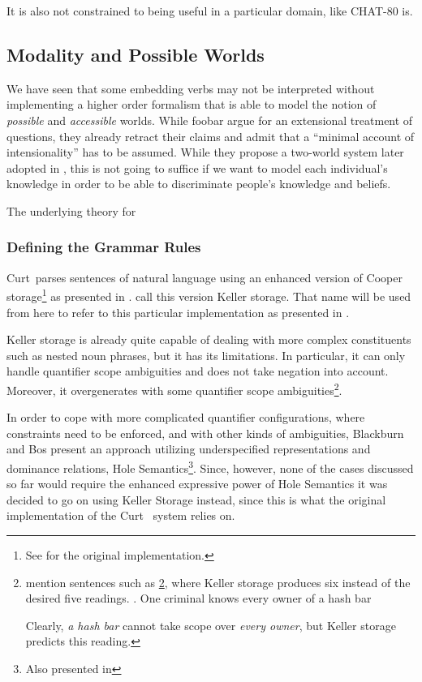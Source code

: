 \documentclass[12pt,a4paper]{article}
\newcommand{\pn}{\textsf} %
\newcommand{\example}{\textit} %
\newcommand{\curt}{\pn{Curt}\mbox{ }}
\theoremstyle{remark} \newtheorem*{termin}{Definition} %
\begin{document}
It is also not constrained to being useful in a particular domain, like
\pn{CHAT-80} is.

\subsection{Modality and Possible Worlds}
\label{sec:indices}

We have seen that some embedding verbs may not be interpreted without
implementing a higher order formalism that is able to model the notion of
\emph{possible} and \emph{accessible} worlds. While foobar %
argue for an extensional treatment of questions, they already %
retract their claims and admit that a ``minimal account of intensionality'' has
to be assumed. While they propose a two-world system later adopted in
\cite{g:is}, this is not going to suffice if we want to model each individual's
knowledge in order to be able to discriminate people's knowledge and beliefs.

The underlying theory for 

\subsubsection{Defining the Grammar Rules}

\curt parses sentences of natural language using an enhanced version of \pn{Cooper
storage}\footnote{See \cite{cooper:storage2} for the original implementation.} as
presented in \cite{keller:storage}. \cite{blackburnbos:cl1} call this version
\pn{Keller storage}. That name will be used from here %
to refer to this particular implementation as presented in
\cite{blackburnbos:cl1}. 

\pn{Keller storage} is already quite capable
of dealing with more complex constituents such as nested noun phrases, but it
has its limitations. In particular, it can only handle quantifier scope
ambiguities and does not take negation into account. Moreover, it overgenerates
with some quantifier scope ambiguities\footnote{\cite{blackburnbos:cl1} mention
sentences such as \ref{ex:kellersucks}, where Keller storage produces six
instead of the desired five readings.
\ex. One criminal knows every owner of a hash bar\label{ex:kellersucks}

Clearly, \example{a hash bar} cannot take scope over \example{every owner}, but
Keller storage predicts this reading.}.

In order to cope with more complicated quantifier configurations, where
constraints need to be enforced, and with other kinds of ambiguities,
Blackburn and Bos present an approach utilizing underspecified representations and
dominance relations, \pn{Hole Semantics}\footnote{Also presented in %
}. Since, however, none of the cases discussed so far would require the enhanced
expressive power of \pn{Hole Semantics} it was decided to go on using \pn{Keller
Storage} instead, since this is what the original implementation of the \curt
system relies on.
\end{document}
